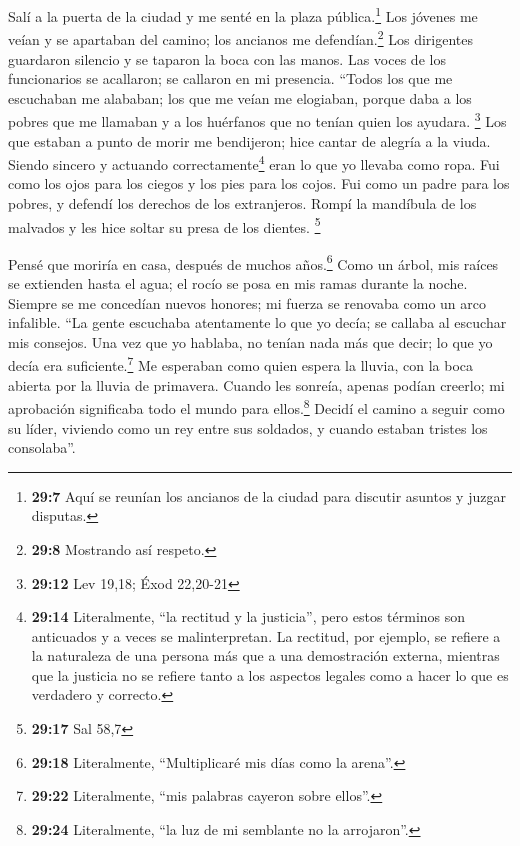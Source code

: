  Salí a la puerta de la ciudad y me senté en la plaza
pública.\footnote{\textbf{29:7} Aquí se reunían los ancianos de la
  ciudad para discutir asuntos y juzgar disputas.}  Los
jóvenes me veían y se apartaban del camino; los ancianos me
defendían.\footnote{\textbf{29:8} Mostrando así respeto.} 
Los dirigentes guardaron silencio y se taparon la boca con las manos.
 Las voces de los funcionarios se acallaron; se callaron
en mi presencia.  ``Todos los que me escuchaban me
alababan; los que me veían me elogiaban,  porque daba a
los pobres que me llamaban y a los huérfanos que no tenían quien los
ayudara. \footnote{\textbf{29:12} Lev 19,18; Éxod 22,20-21}
 Los que estaban a punto de morir me bendijeron; hice
cantar de alegría a la viuda.  Siendo sincero y actuando
correctamente\footnote{\textbf{29:14} Literalmente, ``la rectitud y la
  justicia'', pero estos términos son anticuados y a veces se
  malinterpretan. La rectitud, por ejemplo, se refiere a la naturaleza
  de una persona más que a una demostración externa, mientras que la
  justicia no se refiere tanto a los aspectos legales como a hacer lo
  que es verdadero y correcto.} eran lo que yo llevaba como ropa.
 Fui como los ojos para los ciegos y los pies para los
cojos.  Fui como un padre para los pobres, y defendí los
derechos de los extranjeros.  Rompí la mandíbula de los
malvados y les hice soltar su presa de los dientes. \footnote{\textbf{29:17}
  Sal 58,7}

 Pensé que moriría en casa, después de muchos
años.\footnote{\textbf{29:18} Literalmente, ``Multiplicaré mis días como
  la arena''.}  Como un árbol, mis raíces se extienden
hasta el agua; el rocío se posa en mis ramas durante la noche.
 Siempre se me concedían nuevos honores; mi fuerza se
renovaba como un arco infalible.  ``La gente escuchaba
atentamente lo que yo decía; se callaba al escuchar mis consejos.
 Una vez que yo hablaba, no tenían nada más que decir; lo
que yo decía era suficiente.\footnote{\textbf{29:22} Literalmente, ``mis
  palabras cayeron sobre ellos''.}  Me esperaban como
quien espera la lluvia, con la boca abierta por la lluvia de primavera.
 Cuando les sonreía, apenas podían creerlo; mi aprobación
significaba todo el mundo para ellos.\footnote{\textbf{29:24}
  Literalmente, ``la luz de mi semblante no la arrojaron''.}
 Decidí el camino a seguir como su líder, viviendo como
un rey entre sus soldados, y cuando estaban tristes los consolaba''.

